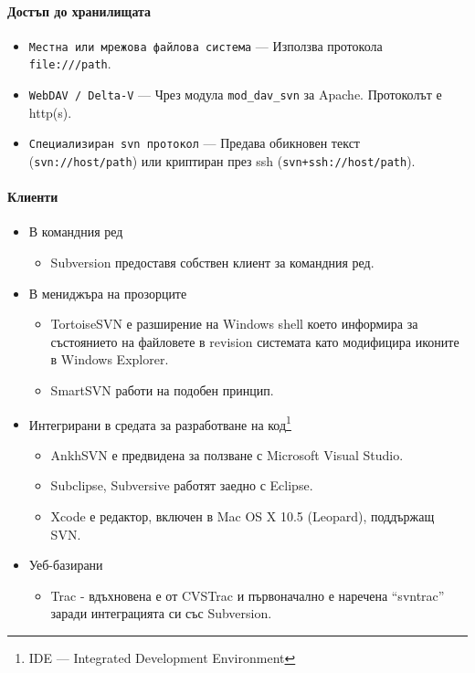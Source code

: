 \documentclass[a4paper]{article}
\begin{document}
    \paragraph{Достъп до хранилищата}

    \begin{itemize}
      \item \texttt{Местна или мрежова файлова система} --- Използва протокола \texttt{file:///path}.
      \item \texttt{WebDAV / Delta-V} --- Чрез модула \texttt{mod\_dav\_svn} за Apache. Протоколът е http(s).
      \item \texttt{Специализиран svn протокол} --- Предава обикновен текст (\texttt{svn://host/path}) или криптиран през ssh (\texttt{svn+ssh://host/path}).
    \end{itemize}

    \paragraph{Клиенти}

    \begin{itemize}
      \item В командния ред
        \begin{itemize}
          \item Subversion предоставя собствен клиент за командния ред.
        \end{itemize}
      \item В мениджъра на прозорците
        \begin{itemize}
          \item TortoiseSVN е разширение на Windows shell което информира за състоянието на файловете в revision системата като модифицира иконите в Windows Explorer.
          \item SmartSVN работи на подобен принцип.
        \end{itemize}
      \item Интегрирани в средата за разработване на код\footnote{IDE --- Integrated Development Environment}
        \begin{itemize}
          \item AnkhSVN е предвидена за ползване с Microsoft Visual Studio.
          \item Subclipse, Subversive работят заедно с Eclipse.
          \item Xcode е редактор, включен в Mac OS X 10.5 (Leopard), поддържащ SVN.
        \end{itemize}
      \item Уеб-базирани
        \begin{itemize}
          \item Trac - вдъхновена е от CVSTrac и първоначално е наречена ``svntrac'' заради интеграцията си със Subversion.
        \end{itemize}
    \end{itemize}
\end{document}
